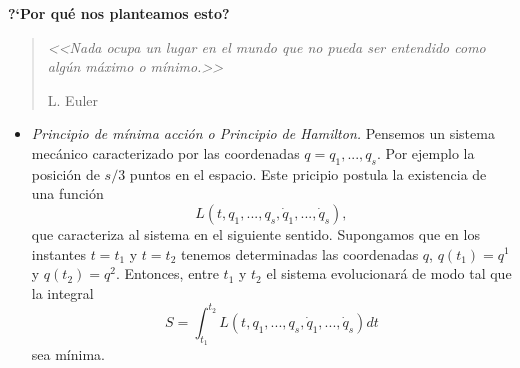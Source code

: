 \documentclass[a4,portrait]{seminar}
\begin{document}
\begin{slide*}

\begin{center}
\begin{large}
\textbf{?`Por qu\'e nos planteamos esto?}
\end{large}
\end{center}
{\raggedleft
\begin{minipage}[l]{7cm}
\begin{quote}
\emph{\small <<Nada ocupa un lugar en el mundo que no pueda ser
entendido como alg\'un m\'aximo o m\'inimo.>>}

{\raggedleft\small L. Euler\par}
\end{quote}
\end{minipage}\par
}






\begin{itemize}
    \item[\ding{226}]
        \emph{Principio de m\'inima acci\'on o Principio  de Hamilton.}
        Pensemos  un sistema
        mec\'anico caracterizado por las coordenadas $q=q_1,...,q_s$.
        Por ejemplo la posici\'on de $s/3$ puntos en el espacio.
        Este pricipio postula la existencia de una funci\'on
        \[
            L(t,q_1,...,q_s,\dot{q}_1,...,\dot{q}_s),
        \]
        que caracteriza al sistema en el siguiente sentido. Supongamos que en
        los instantes $t=t_1$ y $t=t_2$ tenemos
        determinadas las coordenadas  $q$, $q(t_1)=q^1$ y
        $q(t_2)=q^2$. Entonces, entre $t_1$ y $t_2$ el
        sistema evolucionar\'a de modo tal que la integral
        \[
            S=\int_{t_1}^{t_2}L(t,q_1,...,q_s,\dot{q}_1,...,\dot{q}_s)dt
        \]
        sea m\'inima.



\end{itemize}




\end{slide*}
\end{document}
